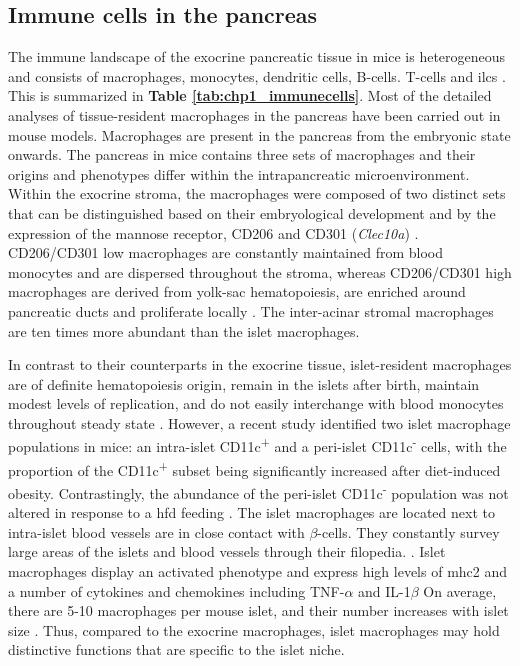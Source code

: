 \subsection{Immune cells in the pancreas}
The immune landscape of the exocrine pancreatic tissue in mice is heterogeneous and consists of macrophages, monocytes, dendritic cells, B-cells. T-cells and \glspl{ilc} \textbf{\cite{calderon_pancreas_2015}}. This is summarized in \textbf{Table \ref{tab:chp1_immunecells}}. Most of the detailed analyses of tissue-resident macrophages in the pancreas have been carried out in mouse models. Macrophages are present in the pancreas from the embryonic state onwards. The pancreas in mice contains three sets of macrophages and their origins and phenotypes differ within the intrapancreatic microenvironment. Within the exocrine stroma, the macrophages were composed of two distinct sets that can be distinguished based on their embryological development and by the expression of the mannose receptor, CD206 and CD301 (\textit{Clec10a}) \textbf{\cite{calderon_pancreas_2015,cruz_macrophages_2020}}. CD206/CD301 low macrophages are constantly maintained from blood monocytes and are dispersed throughout the stroma, whereas CD206/CD301 high macrophages are derived from yolk-sac hematopoiesis, are enriched around pancreatic ducts and proliferate locally \textbf{\cite{calderon_pancreas_2015,cruz_macrophages_2020}}. The inter-acinar stromal macrophages are ten times more abundant than the islet macrophages.\\
\par In contrast to their counterparts in the exocrine tissue, islet-resident macrophages are of definite hematopoiesis origin, remain in the islets after birth, maintain modest levels of replication, and do not easily interchange with blood monocytes throughout steady state \textbf{\cite{calderon_pancreas_2015,cruz_macrophages_2020,carrero_resident_2017}}. However, a recent study identified two islet macrophage populations in mice: an intra-islet CD11c\textsuperscript{+} and a peri-islet CD11c\textsuperscript{-} cells, with the proportion of the CD11c\textsuperscript{+} subset being significantly increased after diet-induced obesity. Contrastingly, the abundance of the peri-islet CD11c\textsuperscript{-} population was not altered in response to a \gls{hfd} feeding \textbf{\cite{ying_expansion_2019}}. The islet macrophages are located next to intra-islet blood vessels are in close contact with $\beta$-cells. They constantly survey large areas of the islets and blood vessels through their filopedia. \textbf{\cite{carrero_resident_2017,calderon_dendritic_2008,zinselmeyer_resident_2018}}. Islet macrophages display an activated phenotype and express high levels of \gls{mhc2} and a number of cytokines and chemokines including TNF-$\alpha$ and IL-1$\beta$ \textbf{\cite{calderon_pancreas_2015,carrero_resident_2017,ferris_islet-resident_2017}} On average, there are 5-10 macrophages per mouse islet, and their number increases with islet size \textbf{\cite{unanue_macrophages_2016}}. Thus, compared to the exocrine macrophages, islet macrophages may hold distinctive functions that are specific to the islet niche.
